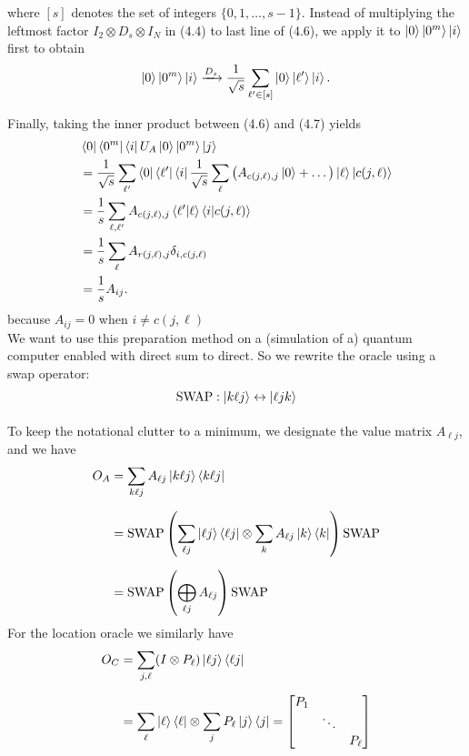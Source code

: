 \documentclass{article}
\begin{document}
where $[s]$ denotes the set of integers $\{0, 1, \dots, s - 1\}$. Instead of multiplying the leftmost factor $I_2 \otimes D_s \otimes I_N$ in (4.4) to last line of (4.6), we apply it to $\ket{0}\ket{0^m}\ket{i}$ first to obtain
\begin{equation}
\ket{0}\ket{0^m}\ket{i} \xrightarrow{D_s} \frac{1}{\sqrt{s}} \sum_{\ell' \in [s]} \ket{0}\ket{\ell'}\ket{i}.
\end{equation}

Finally, taking the inner product between (4.6) and (4.7) yields
\begin{align}
& \bra{0}\bra{0^m}\bra{i} U_A \ket{0}\ket{0^m}\ket{j} \\
& = \frac{1}{\sqrt{s}} \sum_{\ell'} \bra{0}\bra{\ell'}\bra{i} \frac{1}{\sqrt{s}} \sum_{\ell} \left( A_{c(j,\ell),j} \ket{0} + \dots \right) \ket{\ell}\ket{c(j,\ell)} \\
& = \frac{1}{s} \sum_{\ell, \ell'} A_{c(j,\ell),j} \braket{\ell' | \ell} \braket{i | c(j,\ell)} \\
& = \frac{1}{s} \sum_{\ell} A_{r(j,\ell),j} \delta_{i,c(j,\ell)} \\
& = \frac{1}{s} A_{ij}.
\end{align}
because $A_{ij} = 0$  when  $i \neq c(j,\ell)$ \\

We want to use this preparation method on a (simulation of a) quantum computer enabled with direct sum to direct. So we rewrite the oracle using a swap operator:
\begin{align*}
\text{SWAP} &: \ket{k \ell j} \leftrightarrow \ket{\ell j k} \\[1.5ex]
\end{align*}
To keep the notational clutter to a minimum, we designate the value matrix $A_{\ell j}$, and we have
\begin{align*}
O_A &= \sum_{k \ell j} A_{\ell j} \ket{k \ell j}\bra{k \ell j} \\[1.5ex]
&= \text{SWAP} \left( \sum_{\ell j} \ket{\ell j}\bra{\ell j} \otimes \sum_k A_{\ell j} \ket{k}\bra{k} \right) \text{SWAP} \\[1.5ex]
&= \text{SWAP} \left( \bigoplus_{\ell j} A_{\ell j} \right) \text{SWAP}
\end{align*}
For the location oracle we similarly have
\begin{align*}
O_C &= \sum_{j, \ell} (I \otimes P_{\ell}) \ket{\ell j}\bra{\ell j} \\[1.5ex]
&= \sum_{\ell} \ket{\ell}\bra{\ell} \otimes \sum_{j} P_{\ell} \ket{j}\bra{j} = 
\begin{bmatrix}
P_1 & & \\
& \ddots & \\
& & P_{\ell}
\end{bmatrix}
\end{align*}
\end{document}
